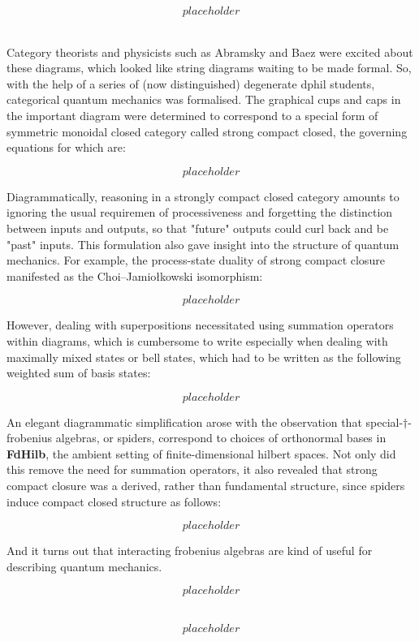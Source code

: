 \begin{fullwidth}
\[placeholder\]

\\

Category theorists and physicists such as Abramsky and Baez were excited about these diagrams, which looked like string diagrams waiting to be made formal. So, with the help of a series of (now distinguished) degenerate dphil students, categorical quantum mechanics was formalised. The graphical cups and caps in the important diagram were determined to correspond to a special form of symmetric monoidal closed category called strong compact closed, the governing equations for which are:

\[placeholder\]

Diagrammatically, reasoning in a strongly compact closed category amounts to ignoring the usual requiremen of processiveness and forgetting the distinction between inputs and outputs, so that "future" outputs could curl back and be "past" inputs. This formulation also gave insight into the structure of quantum mechanics. For example, the process-state duality of strong compact closure manifested as the Choi–Jamiołkowski isomorphism:

\[placeholder\]

However, dealing with superpositions necessitated using summation operators within diagrams, which is cumbersome to write especially when dealing with maximally mixed states or bell states, which had to be written as the following weighted sum of basis states:

\[placeholder\]

An elegant diagrammatic simplification arose with the observation that special-$\dagger$-frobenius algebras, or spiders, correspond to choices of orthonormal bases \citep{} in \textbf{FdHilb}, the ambient setting of finite-dimensional hilbert spaces. Not only did this remove the need for summation operators, it also revealed that strong compact closure was a derived, rather than fundamental structure, since spiders induce compact closed structure as follows:

\[placeholder\]

And it turns out that interacting frobenius algebras are kind of useful for describing quantum mechanics.

\[placeholder\]

\\

\[placeholder\]


\end{fullwidth}
